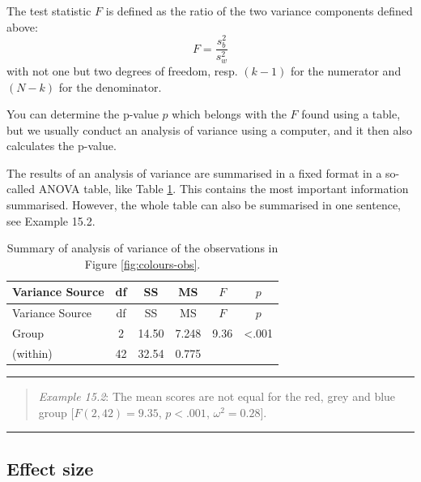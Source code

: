 \documentclass[
]{book}
\begin{document}
The test statistic \(F\) is defined as the ratio of the two
variance components defined above:
\begin{equation}
  \label{eq:Fratio}
    F = \frac{ s^2_b } { s^2_w }
\end{equation}
with not one but two
degrees of freedom, resp. \((k-1)\) for the numerator and \((N-k)\) for the denominator.

You can determine the p-value \(p\) which belongs with the
\(F\) found using a table, but we usually conduct an
analysis of variance using a computer, and it then also calculates the
p-value.

The results of an analysis of variance are summarised in a fixed format
in a so-called ANOVA table, like
Table \ref{tab:colours-anova}. This contains the most important
information summarised. However, the whole table can also be summarised in
one sentence, see Example 15.2.

\begin{longtable}[]{@{}lccccc@{}}
\caption{\label{tab:colours-anova} Summary of analysis of variance of the observations in Figure \ref{fig:colours-obs}.}\tabularnewline
\toprule\noalign{}
Variance Source & df & SS & MS & \(F\) & \(p\) \\
\midrule\noalign{}
\endfirsthead
\toprule\noalign{}
Variance Source & df & SS & MS & \(F\) & \(p\) \\
\midrule\noalign{}
\endhead
\bottomrule\noalign{}
\endlastfoot
Group & 2 & 14.50 & 7.248 & 9.36 & \textless.001 \\
(within) & 42 & 32.54 & 0.775 & & \\
\end{longtable}

\begin{center}\rule{0.5\linewidth}{0.5pt}\end{center}

\begin{quote}
\emph{Example 15.2}:
The mean scores are not equal for the red, grey and blue group
\([F(2,42) = 9.35\), \(p < .001\), \(\omega^2 = 0.28]\).
\end{quote}

\begin{center}\rule{0.5\linewidth}{0.5pt}\end{center}

\hypertarget{sec:anova-oneway-effectsize}{%
\subsection{Effect size}\label{sec:anova-oneway-effectsize}}
\end{document}
